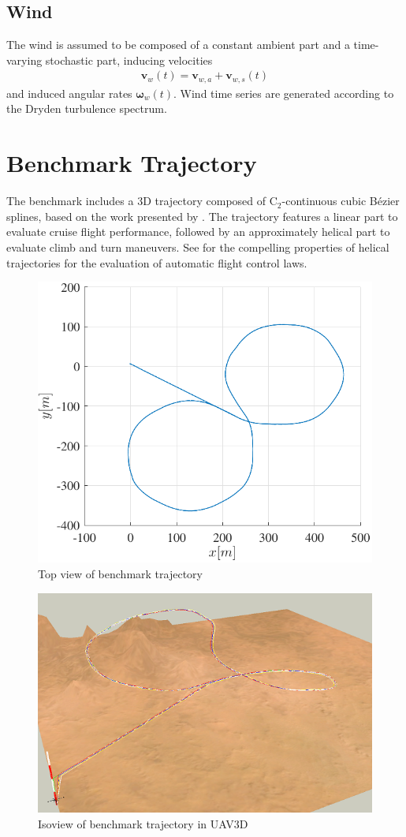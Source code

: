 \documentclass{ifacconf}
\begin{document}
\subsection{Wind}
The wind is assumed to be composed of a constant ambient part and a time-varying stochastic part, inducing velocities
\begin{align}
\mathbf{v}_w(t) = \mathbf{v}_{w,a} + \mathbf{v}_{w,s}(t)
\end{align}
and induced angular rates
$\mathbf{\omega}_w(t)$. 
Wind time series are generated according to the Dryden turbulence spectrum. 
\section{Benchmark Trajectory}
\label{sec:trajectory}
The benchmark includes a 3D trajectory composed of $\mathrm{C}_2$-continuous cubic Bézier splines, based on the work presented by \cite{Yang2008}. The trajectory features a linear part to evaluate cruise flight performance, followed by an approximately helical part to evaluate climb and turn maneuvers. See \cite{looye2011helical} for the compelling properties of helical trajectories for the evaluation of automatic flight control laws.
%
\begin{figure}
\centering
\includegraphics[width=.8\columnwidth]{trajectory.pdf}
\caption{Top view of benchmark trajectory}
\end{figure}
%
\begin{figure}
\centering
\includegraphics[width=.8\columnwidth]{UAV3D_helix-lowres}
\caption{Isoview of benchmark trajectory in UAV3D}
\end{figure}
%
\end{document}
